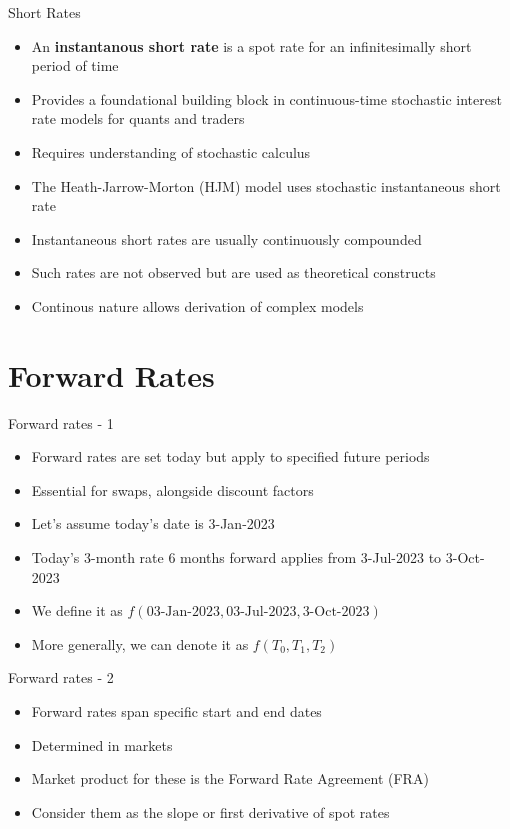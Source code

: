 \documentclass[handout, aspectratio=169]{beamer}
\begin{document}
\begin{frame}{Short Rates}
	\pause
	\begin{itemize}
		\item An \textbf{instantanous short rate} is a spot rate for an infinitesimally short period of time
		\item Provides a foundational building block in continuous-time stochastic interest rate models for quants and traders
		\item Requires understanding of stochastic calculus
		\item The Heath-Jarrow-Morton (HJM) model uses stochastic instantaneous short rate 
		\item Instantaneous short rates are usually continuously compounded
		\item Such rates are not observed but are used as theoretical constructs
		\item Continous nature allows derivation of complex models
	\end{itemize}
\end{frame}

\section{Forward Rates}
\begin{frame}{Forward rates - 1}
	\pause
	\begin{itemize}
		\item Forward rates are set today but apply to specified future periods
		\item Essential for swaps, alongside discount factors
 	\end{itemize}
	\begin{Example}
		\begin{itemize}
			\item Let's assume today's date is 3-Jan-2023
			\item Today's 3-month rate 6 months forward applies from 3-Jul-2023 to 3-Oct-2023
			\item We define it as $f(\text{03-Jan-2023}, \text{03-Jul-2023}, \text{3-Oct-2023})$
			\item More generally, we can denote it as $f(T_0, T_1, T_2)$
		\end{itemize}
	\end{Example}
\end{frame}

\begin{frame}{Forward rates - 2}
	\begin{itemize} 
		\item Forward rates span specific start and end dates
		\item Determined in markets
		\item Market product for these is the Forward Rate Agreement (FRA)
		\item Consider them as the slope or first derivative of spot rates
	\end{itemize}
\end{frame}
\end{document}
